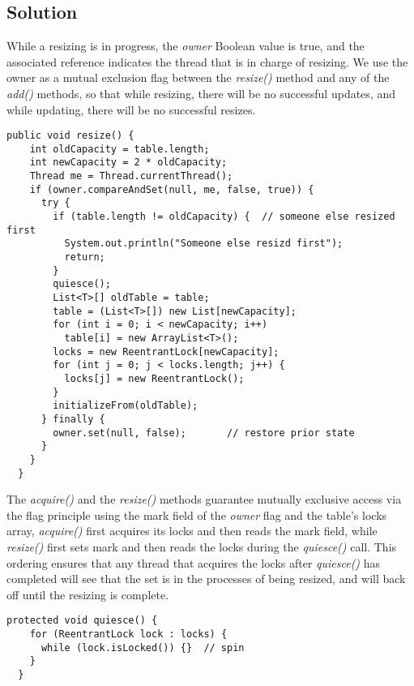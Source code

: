 \subsection{Solution}
\par
While a resizing is in progress, the \textit{owner} Boolean value is true, and the associated reference indicates the thread that is in charge of resizing.
We use the owner as a mutual exclusion flag between the \textit{resize()} method and any of the \textit{add()} methods, so that while resizing, there will be no successful updates, and while updating, there will be no successful resizes.
\par
\begin{lstlisting}[frame=single,breaklines=true]
  public void resize() {
    int oldCapacity = table.length;
    int newCapacity = 2 * oldCapacity;
    Thread me = Thread.currentThread();
    if (owner.compareAndSet(null, me, false, true)) {
      try {
        if (table.length != oldCapacity) {  // someone else resized first
          System.out.println("Someone else resizd first");
          return;
        }
        quiesce();
        List<T>[] oldTable = table;
        table = (List<T>[]) new List[newCapacity];
        for (int i = 0; i < newCapacity; i++)
          table[i] = new ArrayList<T>();
        locks = new ReentrantLock[newCapacity];
        for (int j = 0; j < locks.length; j++) {
          locks[j] = new ReentrantLock();
        }
        initializeFrom(oldTable);
      } finally {
        owner.set(null, false);       // restore prior state
      }
    }
  }
\end{lstlisting}
\par
The \textit{acquire()} and the \textit{resize()} methods guarantee mutually exclusive access via the flag principle using the mark field of the \textit{owner} flag and the table’s locks array, \textit{acquire()} first acquires its locks and then reads the mark field, while \textit{resize()} first sets mark and then reads the locks during the \textit{quiesce()} call. This ordering ensures that any thread that acquires the locks after \textit{quiesce()} has completed will see that the set is in the processes of being resized, and will back off until the resizing is complete.
\par
\begin{lstlisting}[frame=single,breaklines=true]
  protected void quiesce() {
    for (ReentrantLock lock : locks) {
      while (lock.isLocked()) {}  // spin
    }
  }
\end{lstlisting}
\par
